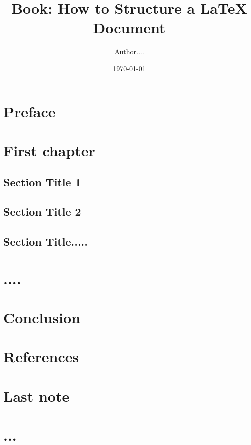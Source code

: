 \documentclass[11pt,a4paper]{book}
\begin{document}
\title{Book: How to Structure a LaTeX Document}
\author{Author....}
\date{\today}

\maketitle

\frontmatter

\chapter{Preface}

\mainmatter
\chapter{First chapter}
\section{Section Title 1}
\section{Section Title 2}

\section{Section Title.....}

\chapter{....}

\chapter{Conclusion}

\chapter*{References}


\backmatter
\chapter{Last note}

\chapter{...}
\end{document}
